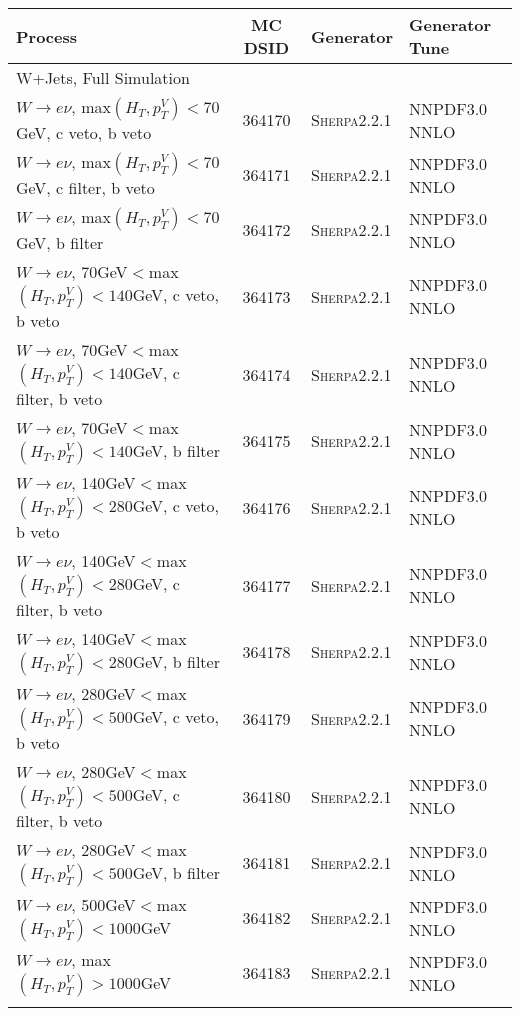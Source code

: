 \begin{table}[h!]
\scriptsize
\begin{center}
{\renewcommand{\arraystretch}{1.2}
\begin{tabular}{@{} lcll @{}}
\hhline{====}
Process	&	 MC DSID		&	Generator	& Generator Tune  \\ \hline
\multicolumn{4}{l}{W+Jets, Full Simulation} \\ \hline
$W\rightarrow e\nu$, max$(H_T,p_T^V)<70$GeV, c veto, b veto &  364170&  \textsc{Sherpa2.2.1} &NNPDF3.0 NNLO \\
$W\rightarrow e\nu$, max$(H_T,p_T^V)<70$GeV, c filter, b veto & 364171&  \textsc{Sherpa2.2.1} &NNPDF3.0 NNLO \\
$W\rightarrow e\nu$, max$(H_T,p_T^V)<70$GeV, b filter & 364172&  \textsc{Sherpa2.2.1} &NNPDF3.0 NNLO \\
$W\rightarrow e\nu$, 70GeV$<$max$(H_T,p_T^V)<140$GeV, c veto, b veto & 364173& \textsc{Sherpa2.2.1} &NNPDF3.0 NNLO \\
$W\rightarrow e\nu$, 70GeV$<$max$(H_T,p_T^V)<140$GeV, c filter, b veto & 364174& \textsc{Sherpa2.2.1} &NNPDF3.0 NNLO \\
$W\rightarrow e\nu$, 70GeV$<$max$(H_T,p_T^V)<140$GeV, b filter & 364175& \textsc{Sherpa2.2.1} &NNPDF3.0 NNLO \\
$W\rightarrow e\nu$, 140GeV$<$max$(H_T,p_T^V)<280$GeV, c veto, b veto & 364176&  \textsc{Sherpa2.2.1} &NNPDF3.0 NNLO \\
$W\rightarrow e\nu$, 140GeV$<$max$(H_T,p_T^V)<280$GeV, c filter, b veto & 364177& \textsc{Sherpa2.2.1} &NNPDF3.0 NNLO \\
$W\rightarrow e\nu$, 140GeV$<$max$(H_T,p_T^V)<280$GeV, b filter & 364178& \textsc{Sherpa2.2.1} &NNPDF3.0 NNLO \\
$W\rightarrow e\nu$, 280GeV$<$max$(H_T,p_T^V)<500$GeV, c veto, b veto & 364179& \textsc{Sherpa2.2.1} &NNPDF3.0 NNLO \\
$W\rightarrow e\nu$, 280GeV$<$max$(H_T,p_T^V)<500$GeV, c filter, b veto & 364180& \textsc{Sherpa2.2.1} &NNPDF3.0 NNLO \\
$W\rightarrow e\nu$, 280GeV$<$max$(H_T,p_T^V)<500$GeV, b filter &  364181& \textsc{Sherpa2.2.1} &NNPDF3.0 NNLO \\
$W\rightarrow e\nu$, 500GeV$<$max$(H_T,p_T^V)<1000$GeV & 364182& \textsc{Sherpa2.2.1} &NNPDF3.0 NNLO \\
$W\rightarrow e\nu$, max$(H_T,p_T^V)>1000$GeV&  364183&  	 \textsc{Sherpa2.2.1} &NNPDF3.0 NNLO \\	\\

\end{tabular}}
\end{center}
\end{table}

